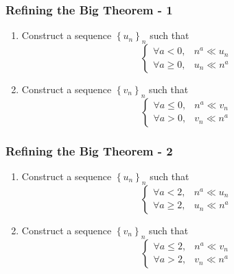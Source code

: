 \begin{frame}[t]
	\frametitle{Refining the Big Theorem - 1}

	\begin{enumerate}
		\item Construct a sequence $\displaystyle \left\{ u_{n} \right\}_{n}$ such that
			\[
				\begin{cases}
					\forall a < 0,    & n^{a}\ll u_{n} \\
					\forall a \geq 0, & u_{n}\ll n^{a}
				\end{cases}
			\]

		\item Construct a sequence $\displaystyle \left\{ v_{n} \right\}_{n}$ such that
			\[
				\begin{cases}
					\forall a \leq 0, & n^{a}\ll v_{n} \\
					\forall a > 0,    & v_{n}\ll n^{a}
				\end{cases}
			\]
	\end{enumerate}
\end{frame}

\begin{frame}[t]
	\frametitle{Refining the Big Theorem - 2}

	\begin{enumerate}
		\item Construct a sequence $\displaystyle \left\{ u_{n} \right\}_{n}$ such that
			\[
				\begin{cases}
					\forall a < 2,    & n^{a}\ll u_{n} \\
					\forall a \geq 2, & u_{n}\ll n^{a}
				\end{cases}
			\]

		\item Construct a sequence $\displaystyle \left\{ v_{n} \right\}_{n}$ such that
			\[
				\begin{cases}
					\forall a \leq 2, & n^{a}\ll v_{n} \\
					\forall a > 2,    & v_{n}\ll n^{a}
				\end{cases}
			\]
	\end{enumerate}
\end{frame}


